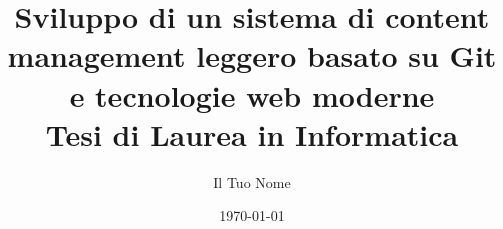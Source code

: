 \documentclass[11pt, a4paper]{report}
\title{
    {\Huge Sviluppo di un sistema di content management leggero basato su Git e tecnologie web moderne} \\
    \vspace{1.5cm}
    {\Large Tesi di Laurea in Informatica}
}
\author{Il Tuo Nome}
\date{\today}
\begin{document}
\maketitle

\begin{abstract}
\end{abstract}

\tableofcontents %

\cleardoublepage








\cleardoublepage

\end{document}
